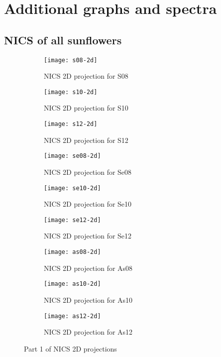 \chapter{Additional graphs and spectra}

\newpage
\section{NICS of all sunflowers}

\begin{figure*}[h]
\centering
\begin{subfigure}{5.5cm}\centering\texttt{[image: s08-2d]}\caption{NICS 2D projection for S08}\end{subfigure}%
\begin{subfigure}{5.5cm}\centering\texttt{[image: s10-2d]}\caption{NICS 2D projection for S10}\end{subfigure}%
\begin{subfigure}{5.5cm}\centering\texttt{[image: s12-2d]}\caption{NICS 2D projection for S12}\end{subfigure}
\begin{subfigure}{5.5cm}\centering\texttt{[image: se08-2d]}\caption{NICS 2D projection for Se08}\end{subfigure}%
\begin{subfigure}{5.5cm}\centering\texttt{[image: se10-2d]}\caption{NICS 2D projection for Se10}\end{subfigure}%
\begin{subfigure}{5.5cm}\centering\texttt{[image: se12-2d]}\caption{NICS 2D projection for Se12}\end{subfigure}
\begin{subfigure}{5.5cm}\centering\texttt{[image: as08-2d]}\caption{NICS 2D projection for As08}\end{subfigure}%
\begin{subfigure}{5.5cm}\centering\texttt{[image: as10-2d]}\caption{NICS 2D projection for As10}\end{subfigure}%
\begin{subfigure}{5.5cm}\centering\texttt{[image: as12-2d]}\caption{NICS 2D projection for As12}\end{subfigure}
\caption[Part 1 of NICS 2D projections]{Part 1 of NICS 2D projections}
\end{figure*}

\newpage

